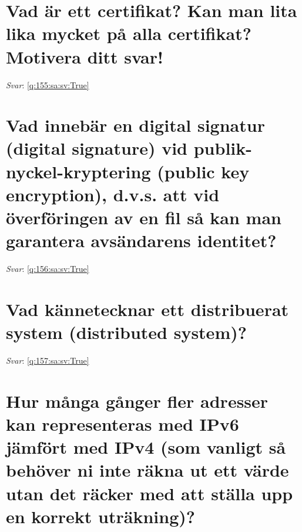 \documentclass[a4paper,11pt,oneside]{book}
\begin{document}
\begin{sloppypar}
\section{Vad \"ar ett certifikat? Kan man lita lika mycket p\r{a} alla certifikat? Motivera ditt svar!}

\label{q:155:sa:sv:False}

\vspace{2cm}

\noindent\makebox[\textwidth]{\hrulefill}

\vspace{1cm}

\textit{Svar}: \autoref{q:155:sa:sv:True}



\section{Vad inneb\"ar en digital signatur (digital signature) vid publik-nyckel-kryptering (public key encryption), d.v.s. att vid \"overf\"oringen av en fil s\r{a} kan man garantera avs\"andarens identitet?}

\label{q:156:sa:sv:False}

\vspace{2cm}

\noindent\makebox[\textwidth]{\hrulefill}

\vspace{1cm}

\textit{Svar}: \autoref{q:156:sa:sv:True}



\section{Vad k\"annetecknar ett distribuerat system (distributed system)?}

\label{q:157:sa:sv:False}

\vspace{2cm}

\noindent\makebox[\textwidth]{\hrulefill}

\vspace{1cm}

\textit{Svar}: \autoref{q:157:sa:sv:True}



\section{Hur m\r{a}nga g\r{a}nger fler adresser kan representeras med IPv6 j\"amf\"ort med IPv4 (som vanligt s\r{a} beh\"over ni inte r\"akna ut ett v\"arde utan det r\"acker med att st\"alla upp en korrekt utr\"akning)?}


\end{sloppypar}
\end{document}
